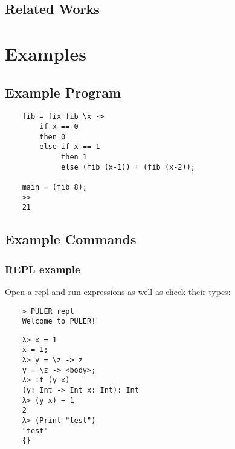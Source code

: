 \documentclass{article} %
\begin{document}
    \subsection{Related Works}

\section{Examples}
\subsection{Example Program}
\begin{verbatim}
    fib = fix fib \x ->
        if x == 0
        then 0
        else if x == 1
             then 1
             else (fib (x-1)) + (fib (x-2));
    
    main = (fib 8);
    >>
    21
\end{verbatim}

\subsection{Example Commands}
\subsubsection{REPL example}
Open a repl and run expressions as well as check their types:
\begin{verbatim}
    > PULER repl
    Welcome to PULER!
\end{verbatim}
\begin{verbatim}
    λ> x = 1
    x = 1;
    λ> y = \z -> z
    y = \z -> <body>;
    λ> :t (y x)
    (y: Int -> Int x: Int): Int
    λ> (y x) + 1
    2
    λ> (Print "test")
    "test"
    {}
\end{verbatim}
\end{document}
